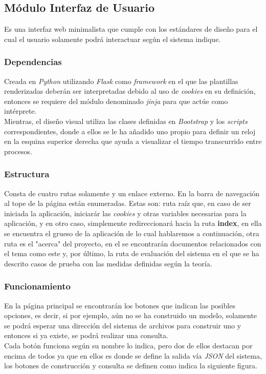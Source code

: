 \documentclass{llncs}
\begin{document}
\subsection{M\'odulo Interfaz de Usuario}

Es una interfaz web minimalista que cumple con los est\'andares de dise\~no para el cual el usuario solamente podr\'a interactuar
seg\'un el sistema indique.

\subsubsection{Dependencias}

Creada en {\textit{Python}} utilizando {\textit{Flask}} como {\textit{framework}} en el que las plantillas renderizadas deber\'an 
ser interpretadas debido al uso de {\textit{cookies}} en su definici\'on, entonces se requiere del m\'odulo denominado {\textit{jinja}}
para que act\'ue como int\'erprete.\\
Mientras, el dise\~no visual utiliza las clases definidas en {\textit{Bootstrap}} y los {\textit{scripts}} correspondientes, donde a
ellos se le ha a\~nadido uno propio para definir un reloj en la esquina superior derecha que ayuda a visualizar el tiempo transcurrido
entre procesos.

\subsubsection{Estructura}

Consta de cuatro rutas solamente y un enlace externo. En la barra de navegaci\'on al tope de la p\'agina est\'an enumeradas. Estas
son: ruta ra\'iz que, en caso de ser iniciada la aplicaci\'on, iniciar\'ar las {\textit{cookies}} y otras variables necesarias para la aplicaci\'on,
y en otro caso, simplemente redireccionar\'a hacia la ruta {\textbf{index}}, en ella se encuentra el grueso de la aplicaci\'on de lo cual
hablaremos a continuaci\'on, otra ruta es el "acerca" del proyecto, en el se encontrar\'an documentos relacionados con el tema como este
y, por \'ultimo, la ruta de evaluaci\'on del sistema en el que se ha descrito casos de prueba con las medidas definidas seg\'un la teor\'ia.

\subsubsection{Funcionamiento}

En la p\'agina principal se encontrar\'an los botones que indican las posibles opciones, es decir, si por ejemplo, a\'un no se ha construido
un modelo, solamente se podr\'a esperar una direcci\'on del sistema de archivos para construir uno y entonces si ya existe, se podr\'a
realizar una consulta.\\
Cada bot\'on funciona seg\'un su nombre lo indica, pero dos de ellos destacan por encima de todos ya que en ellos es donde se define
la salida v\'ia {\textit{JSON}} del sistema, los botones de construcci\'on y consulta se definen como indica la siguiente figura.
\end{document}

